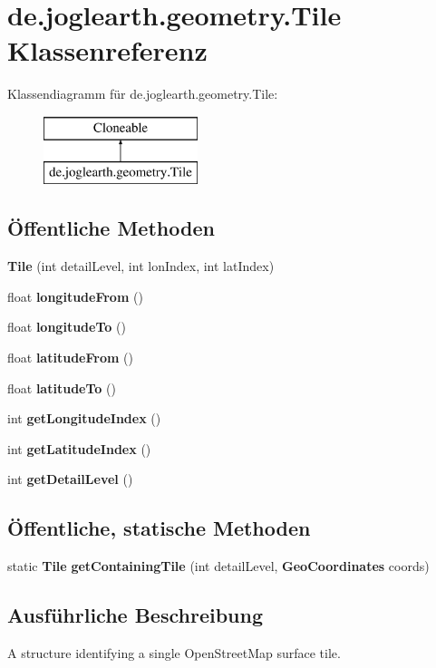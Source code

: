 \section{de.\-joglearth.\-geometry.\-Tile Klassenreferenz}
\label{classde_1_1joglearth_1_1geometry_1_1_tile}
Klassendiagramm für de.\-joglearth.\-geometry.\-Tile\-:\begin{figure}[H]
\begin{center}
\leavevmode
\includegraphics[height=2.000000cm]{classde_1_1joglearth_1_1geometry_1_1_tile}
\end{center}
\end{figure}
\subsection*{Öffentliche Methoden}
\begin{DoxyCompactItemize}
\item 
{\bf Tile} (int detail\-Level, int lon\-Index, int lat\-Index)
\item 
float {\bf longitude\-From} ()
\item 
float {\bf longitude\-To} ()
\item 
float {\bf latitude\-From} ()
\item 
float {\bf latitude\-To} ()
\item 
int {\bf get\-Longitude\-Index} ()
\item 
int {\bf get\-Latitude\-Index} ()
\item 
int {\bf get\-Detail\-Level} ()
\end{DoxyCompactItemize}
\subsection*{Öffentliche, statische Methoden}
\begin{DoxyCompactItemize}
\item 
static {\bf Tile} {\bf get\-Containing\-Tile} (int detail\-Level, {\bf Geo\-Coordinates} coords)
\end{DoxyCompactItemize}


\subsection{Ausführliche Beschreibung}
A structure identifying a single Open\-Street\-Map surface tile. 

